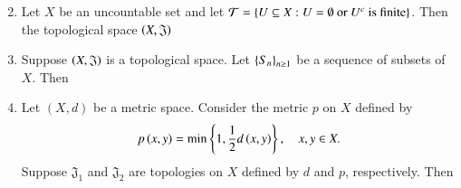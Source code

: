 \documentclass[journal]{IEEEtran}
\begin{document}
\begin{enumerate}
\begin{enumerate}
\begin{multicols}{2}
\end{multicols}
\end{enumerate}
\item Let $X$ be an uncountable set and let
$ \mathcal{T} = \left\{ U \subseteq X : U = \emptyset \text{ or } U^c \text{ is finite} \right\} $.
Then the topological space $\left(X, \mathfrak{J}\right)$
\begin{enumerate}
\end{enumerate}
\item Suppose $\left(X, \mathfrak{J}\right)$ is a topological space. Let $\left\{S_n\right\}_{n \geq 1}$ be a sequence of subsets of $X$. Then
\begin{enumerate}
\end{enumerate}
\item Let $(X, d)$ be a metric space. Consider the metric $p$ on $X$ defined by $$p\left(x, y\right) = \min\left\{1, \frac{1}{2}d\left(x, y\right)\right\}, \quad x, y \in X.$$ Suppose $\mathfrak{J}_{1}$ and $\mathfrak{J}_{2}$ are topologies on $X$ defined by $d$ and $p$, respectively. Then
\begin{enumerate}
\end{enumerate}

\end{enumerate}
\end{document}
